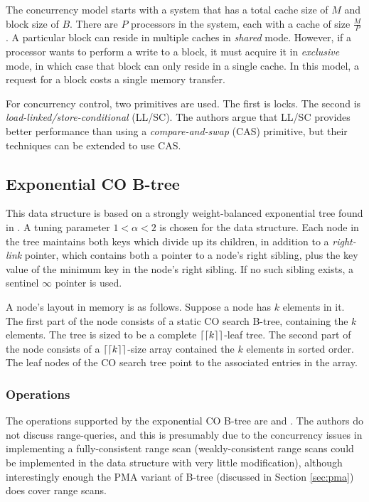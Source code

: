 \documentclass{style}
\begin{document}
The concurrency model starts with a system that has a total cache size of $M$
and block size of $B$. There are $P$ processors in the system, each with a
cache of size $\frac{M}{P}$. A particular block can reside in multiple caches
in \textit{shared} mode. However, if a processor wants to perform a write to a
block, it must acquire it in \textit{exclusive} mode, in which case that block
can only reside in a single cache. In this model, a request for a block costs
a single memory transfer.

For concurrency control, two primitives are used. The first is locks. The
second is \textit{load-linked/store-conditional} (LL/SC). The authors argue
that LL/SC provides better performance than using a \textit{compare-and-swap}
(CAS) primitive, but their techniques can be extended to use CAS.

\subsection{Exponential CO B-tree}

This data structure is based on a strongly weight-balanced exponential tree
found in \cite{Bender2002}. A tuning parameter $1 < \alpha < 2$ is chosen for
the data structure. Each node in the tree maintains both keys which divide up
its children, in addition to a \textit{right-link} pointer, which contains
both a pointer to a node's right sibling, plus the key value of the minimum
key in the node's right sibling. If no such sibling exists, a sentinel
$\infty$ pointer is used.

A node's layout in memory is as follows. Suppose a node has $k$ elements in
it. The first part of the node consists of a static CO search B-tree,
containing the $k$ elements. The tree is sized to be a complete $\lceil\lceil k
\rceil\rceil$-leaf tree. The second part of the node consists of a $\lceil\lceil
k \rceil\rceil$-size array contained the $k$ elements in sorted order. The leaf
nodes of the CO search tree point to the associated entries in the array.

\subsubsection{Operations}

The operations supported by the exponential CO B-tree are \Search{} and
\Insert{}. The authors do not discuss range-queries, and this is presumably
due to the concurrency issues in implementing a fully-consistent range scan
(weakly-consistent range scans could be implemented in the data structure with
very little modification), although interestingly enough the PMA variant of
B-tree (discussed in Section \ref{sec:pma}) does cover range scans.
\end{document}

